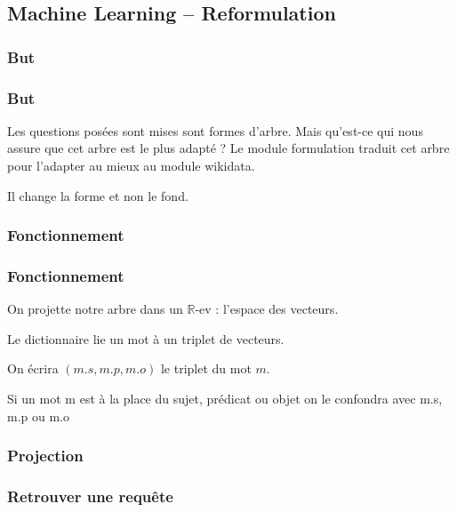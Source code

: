 \subsection{Machine Learning \--- Reformulation}

\subsubsection{But}

\begin{frame}
\frametitle{But}
Les questions posées sont mises sont formes d'arbre. Mais qu'est-ce qui nous assure que cet arbre est le plus adapté ?
\pause
Le module formulation traduit cet arbre pour l'adapter au mieux au module wikidata.

Il change la forme et non le fond.
\end{frame}

\subsubsection{Fonctionnement}
\begin{frame}
\frametitle{Fonctionnement}
On projette notre arbre dans un $\mathbb{R}$-ev : l'espace des vecteurs.

\begin{defi}
Le dictionnaire lie un mot à un triplet de vecteurs.

On écrira $(m.s,m.p,m.o)$ le triplet du mot $m$.
\end{defi}

Si un mot m est à la place du sujet, prédicat ou objet on le confondra avec m.s, m.p ou m.o

\end{frame}

\begin{frame}
\frametitle{Projection}
\end{frame}

\subsubsection{Retrouver une requête}

